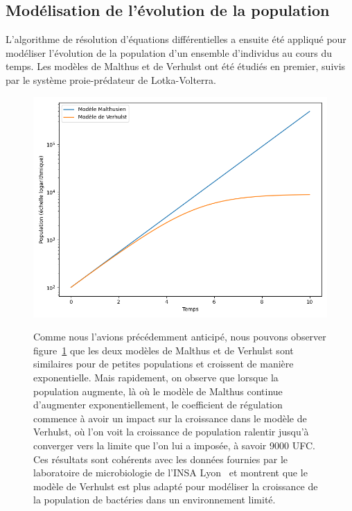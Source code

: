 \documentclass{article}
\begin{document}
\subsection{Modélisation de l'évolution de la population}
L'algorithme de résolution d'équations différentielles a ensuite été appliqué pour modéliser l'évolution de la population d'un ensemble d'individus au cours du temps. Les modèles de Malthus et de Verhulst ont été étudiés en premier, suivis par le système proie-prédateur de Lotka-Volterra.
\begin{figure}[H]
  \begin{minipage}{0.48\textwidth}
    \centering
    \includegraphics[width=\textwidth]{img/population_models.png}
    \label{fig:population_models}
    \end{minipage}
    \hfill
    \begin{minipage}{0.48\textwidth}
    Comme nous l'avions précédemment anticipé, nous pouvons observer figure~\ref{fig:population_models} que les deux modèles de Malthus et de Verhulst sont similaires pour de petites populations et croissent de manière exponentielle.
    Mais rapidement, on observe que lorsque la population augmente, là où le modèle de Malthus continue d'augmenter
    exponentiellement, le coefficient de régulation commence à avoir un impact sur la croissance dans le modèle de Verhulst, 
    où l'on voit la croissance de population ralentir jusqu'à converger vers la limite que l'on lui a imposée, à savoir 9000 UFC.
    Ces résultats sont cohérents avec les données fournies par le laboratoire de microbiologie de l'INSA Lyon~\cite{insa2024microorganismes} et montrent que le modèle de Verhulst est plus adapté pour modéliser la croissance de la population de bactéries dans un environnement limité.
    \end{minipage}
\end{figure}
\end{document}
